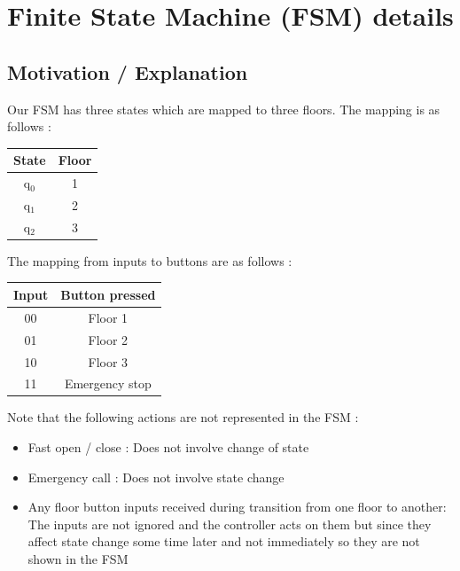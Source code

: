 \documentclass{article}
\begin{document}
\section{Finite State Machine (FSM) details}

\subsection{Motivation / Explanation}
Our \gls{FSM} has three states which are mapped to three floors. The mapping is as follows : 
\begin{center}
\begin{tabular}{|c|c|}
\hline
State & Floor \\
\hline
q$_0$ & 1 \\
q$_1$ & 2\\
q$_2$ & 3 \\
\hline
\end{tabular}
\end{center}

The mapping from inputs to buttons are as follows : 
\begin{center}
\begin{tabular}{|c|c|}
\hline
Input & Button pressed \\
\hline
00 & Floor 1 \\
01 & Floor 2\\
10 & Floor 3 \\
11 & Emergency stop \\
\hline
\end{tabular}
\end{center}

Note that the following actions are not represented in the FSM :
\begin{itemize}
\item Fast open / close : Does not involve change of state
\item Emergency call : Does not involve state change
\item Any floor button inputs received during transition from one floor to another: The inputs are not ignored and the controller acts on them but since they affect state change some time later and not immediately so they are not shown in the FSM
\end{itemize}
\end{document}

